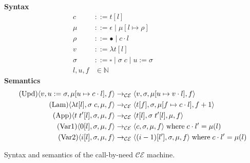 \begin{figure*}
\textbf{Syntax}
\begin{align*}
\tag{Closure} c &::= t [l] \\
\tag{Heap} \mu &::= \epsilon \; | \; \mu [ l \mapsto \rho ] \\
\tag{Environment} \rho &::= \bullet \; | \; c \cdot l \\
\tag{Value} v &::= \lambda t[l] \\
\tag{Context} \sigma &::= \square \; | \; \sigma \; c \;  | \; u:=\sigma \\
\tag{Location} l,u,f &\in \mathbb{N}
\end{align*}
\textbf{Semantics}
\begin{align*}
\tag{Upd}
\langle v, u := \sigma, \mu[u \mapsto c \cdot l], f \rangle 
  &\rightarrow_{\mathcal{CE}} 
\langle v, \sigma, \mu[u \mapsto v \cdot l], f \rangle  \\
\tag{Lam}
\langle \lambda t[l], \sigma \; c, \mu, f \rangle 
  &\rightarrow_{\mathcal{CE}}
\langle t[f], \sigma, \mu[f \mapsto c \cdot l], f+1 \rangle  \\
\tag{App}
\langle t \; t'[l], \sigma, \mu, f \rangle
  &\rightarrow_{\mathcal{CE}}
\langle t[l], \sigma \; t'[l], \mu, f \rangle \\
\tag{Var1}
\langle 0[l], \sigma, \mu, f \rangle
  &\rightarrow_{\mathcal{CE}}
\langle c, \sigma, \mu, f \rangle 
\; \textnormal{where} \; c \cdot l' = \mu(l)\\
\tag{Var2}
\langle i[l], \sigma, \mu, f \rangle
  &\rightarrow_{\mathcal{CE}}
\langle (i-1)[l'], \sigma, \mu, f \rangle
\; \textnormal{where} \; c \cdot l' = \mu(l) \\
\end{align*}
\caption{Syntax and semantics of the call-by-need $\mathcal{CE}$ machine.}
\label{fig:L}
\end{figure*}
